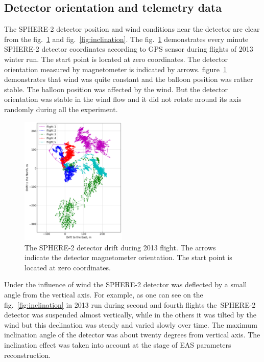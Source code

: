 \documentclass[final,5p,times,twocolumn]{elsarticle}
\begin{document}
\subsection{Detector orientation and telemetry data\label{sect:telemetrydata}}

The \mbox{SPHERE-2} detector position and wind conditions near the detector are clear from the fig.~\ref{fig:gps_compass} and fig.~\ref{fig:inclination}. The fig.~\ref{fig:gps_compass} demonstrates every minute \mbox{SPHERE-2} detector coordinates according to GPS sensor during flights of 2013 winter run. The start point is located at zero coordinates. The detector orientation measured by magnetometer is indicated by arrows. figure~\ref{fig:gps_compass} demonstrates that wind was quite constant and the balloon position was rather stable. The balloon position was affected by the wind. But the detector orientation was stable in the wind flow and it did not rotate around its axis randomly during all the experiment.  

\begin{figure}[tb]
\includegraphics[width=0.45\textwidth]{figs/GPS+quiver.pdf}\hspace{2pc}%
\caption{The SPHERE-2 detector drift during 2013 flight. The arrows indicate the detector magnetometer orientation. The start point is located at zero coordinates.}
\label{fig:gps_compass}
\end{figure}

Under the influence of wind the SPHERE-2 detector was deflected by a small angle from the vertical axis. For example, as one can see on the fig.~\ref{fig:inclination} in 2013 run during second and fourth flights the~\mbox{SPHERE-2} detector was suspended almost vertically, while in the others it was tilted by the wind but this declination was steady and varied slowly over time. The maximum inclination angle of the detector was about twenty degrees from vertical axis. The inclination effect was taken into account at the stage of EAS parameters reconstruction.
\end{document}
